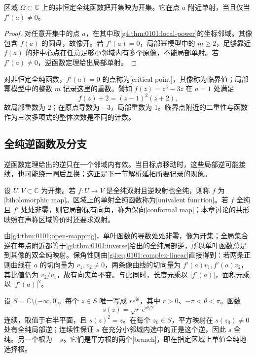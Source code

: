 \begin{theorem}[开映射定理]
	\label{g4:thm:0101:open-mapping}
	区域 \(\Omega\subset\mathbb C\) 上的非恒定全纯函数把开集映为开集。它在点 \(a\) 附近单射，当且仅当 \(f'(a)\ne0\)。
\end{theorem}
\begin{proof}
	对任意开集中的点 \(a\)，在其中取\cref{g4:thm:0101:local-power}的坐标邻域。其像包含 \(f(a)\) 的圆盘，故像开。若 \(f'(a)=0\)，局部幂模型中的 \(m\ge2\)，足够靠近 \(f(a)\) 的非中心点在任意足够小邻域内有多个原像，不能局部单射。若 \(f'(a)\ne0\)，逆函数定理给出局部单射。
\end{proof}

对非恒定全纯函数，\(f'(a)=0\) 的点称为[critical point]，其像称为临界值；局部幂模型中的整数 \(m\) 记录这里的重数。譬如 \(f(z)=z^3-3z\) 在 \(a=1\) 处满足
\[
	f(z)+2=(z-1)^2(z+2),
\]
故局部重数为 \(2\)；在原点导数为 \(-3\)，局部重数为 \(1\)。临界点附近的二重性与函数作为三次多项式的整体次数是不同的计数。

\subsection{全纯逆函数及分支}
\label{g4:subsec:0101:04}
逆函数定理给出的逆只在一个邻域内有效。当目标点移动时，这些局部逆可能接续，也可能绕一圈后互换；这正是下一节解析延拓所要记录的现象。

\begin{definition}
	\label{g4:def:0101:biholomorphic}
	设 \(U,V\subset\mathbb C\) 为开集。若 \(f:U\to V\) 是全纯双射且逆映射也全纯，则称 \(f\) 为[biholomorphic map]。区域上的单射全纯函数称为[univalent function]。若 \(f\) 全纯且 \(f'\) 处处非零，则它局部保有向角，称为保向[conformal map]；本章讨论的共形映照在声称区域等价时还要求双射。
\end{definition}

由\cref{g4:thm:0101:open-mapping}，单叶函数的导数处处非零，像为开集；全局集合逆在每点附近都等于\cref{g4:thm:0101:inverse}给出的全纯局部逆，所以单叶函数总是到其像的双全纯映射。保角性则由\eqref{g4:eq:0101:complex-linear}直接得到：若两条正则曲线在 \(a\) 的切向量为 \(v_1,v_2\ne0\)，两条像曲线的切向量为 \(f'(a)v_1,f'(a)v_2\)，其比值仍为 \(v_2/v_1\)，故有向夹角不变。与此同时，长度元乘以 \(|f'(a)|\)，面积元乘以 \(|f'(a)|^2\)。

\begin{example}
	\label{g4:exm:0101:square-branches}
	设 \(S=\mathbb C\setminus(-\infty,0]\)。每个 \(z\in S\) 唯一写成 \(r e^{\mathrm i\theta}\)，其中 \(r>0\)、\(-\pi<\theta<\pi\)。函数
	\[
		s(z)=\sqrt r\,e^{\mathrm i\theta/2}
	\]
	连续，取值于右半平面，且 \(s(z)^2=z\)。在每个 \(z_0\in S\)，平方映射在 \(s(z_0)\ne0\) 处有全纯局部逆；连续性保证 \(s\) 在充分小邻域内选中的正是这个逆，因此 \(s\) 全纯。另一个根为 \(-s\)。它们是平方根的两个[branch]，即在指定区域上单值全纯地选择根。
\end{example}

